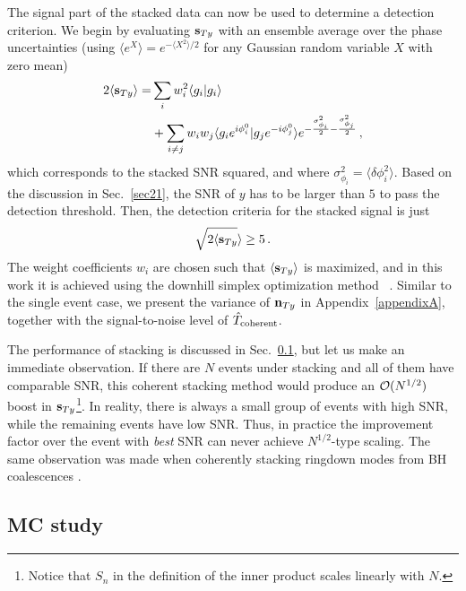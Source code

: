 \documentclass[prd,aps,floatfix,superscriptaddress,nofootinbib,twocolumn,10pt,English]{revtex4-1}
\begin{document}
The signal part of the stacked data can now be used to determine a
detection criterion.  We begin by evaluating ${\bf s}_{Ty}$ with an
ensemble average over the phase uncertainties (using $\langle e^X
\rangle =e^{-\langle X^2 \rangle /2} $ for any Gaussian random
variable $X$ with zero mean)
\begin{align}\label{eqts}
2 \langle {\bf s}_{Ty} \rangle =&\sum_i w^2_i \langle g_i | g_i \rangle \nonumber \\
 &+\sum_{i \neq j} w_i w_j \langle g_i  e^{i  \phi^0_i} | g_j  e^{-i \phi^0_j} \rangle  e^{-\frac{\sigma^2_{\phi_i}}{2}-\frac{\sigma^2_{\phi_j}}{2}}\,,
\end{align}
which corresponds to the stacked SNR squared, and
where $\sigma^2_{\phi_i} =\langle \delta \phi_i^2 \rangle$. Based on
the discussion in Sec.~\ref{sec21}, the SNR of $y$ has to be larger
than $5$ to pass the detection threshold. Then, the detection criteria
for the stacked signal is just
\begin{align}\label{eqcsreq}
\sqrt{2 \langle {\bf s}_{Ty} }\rangle \ge 5\,.
\end{align}
The weight coefficients $w_i$ are chosen such that $\langle {\bf
  s}_{Ty} \rangle$ is maximized, and in this work it is achieved 
using the downhill simplex optimization method
~\cite{Nelder1965, Press:2007nr}. Similar to the single event case, we 
present the variance of ${\bf n}_{Ty}$ in Appendix~\ref{appendixA}, together
with the signal-to-noise level of $\hat{T}_{\rm coherent}$.
  
The performance of stacking is discussed in Sec.~\ref{sec32}, but let
us make an immediate observation. If there are $N$ events under
stacking and all of them have comparable SNR, this coherent stacking
method would produce an ${\cal{O}}(N^{1/2})$ boost in ${\bf
  s}_{Ty}$\footnote{Notice that $S_n$ in the definition of the inner
  product scales linearly with $N$.}. In reality, there is always a
small group of events with high SNR, while the remaining events have
low SNR. Thus, in practice the improvement factor over the event with
{\em best} SNR can never achieve $N^{1/2}$-type scaling. The same
observation was made when coherently stacking ringdown modes from BH
coalescences \cite{yang2017black}.

\subsection{MC study}
\label{sec32}
\end{document}
